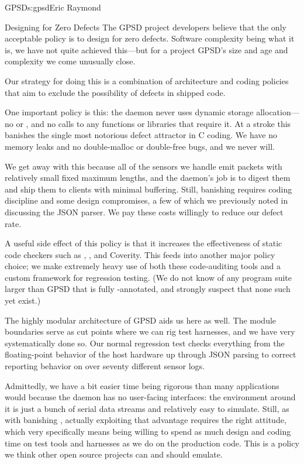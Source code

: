 \begin{aosachapter}{GPSD}{s:gpsd}{Eric Raymond}
\begin{aosasect1}{Designing for Zero Defects}
The GPSD project developers believe that the only acceptable policy is
to design for zero defects. Software complexity being what it is, we
have not quite achieved this---but for a project GPSD's size and age
and complexity we come unusually close.


Our strategy for doing this is a combination of architecture and
coding policies that aim to exclude the possibility of defects in
shipped code.


One important policy is this: the  daemon never uses
dynamic storage allocation---no  or , and no
calls to any functions or libraries that require it.  At a stroke
this banishes the single most notorious defect attractor in C coding.
We have no memory leaks and no double-malloc or double-free bugs, and
we never will.

We get away with this because all of the sensors we handle emit
packets with relatively small fixed maximum lengths, and the daemon's
job is to digest them and ship them to clients with minimal buffering.
Still, banishing  requires coding discipline and some
design compromises, a few of which we previously noted in discussing
the JSON parser. We pay these costs willingly to reduce our defect
rate.

A useful side effect of this policy is that it increases the
effectiveness of static code checkers such as ,
, and Coverity.  This feeds into another major policy
choice; we make extremely heavy use of both these code-auditing tools
and a custom framework for regression testing.  (We do not know of any
program suite larger than GPSD that is fully -annotated,
and strongly suspect that none such yet exist.)

The highly modular architecture of GPSD aids us here as well. The
module boundaries serve as cut points where we can rig test harnesses,
and we have very systematically done so.  Our normal regression test
checks everything from the floating-point behavior of the host
hardware up through JSON parsing to correct reporting behavior on over
seventy different sensor logs.

Admittedly, we have a bit easier time being rigorous than many
applications would because the daemon has no user-facing interfaces:
the environment around it is just a bunch of serial data streams and
relatively easy to simulate.  Still, as with banishing ,
actually exploiting that advantage requires the right attitude, which
very specifically means being willing to spend as much design and
coding time on test tools and harnesses as we do on the production
code.  This is a policy we think other open source projects can and
should emulate.


\end{aosasect1}
\end{aosachapter}

